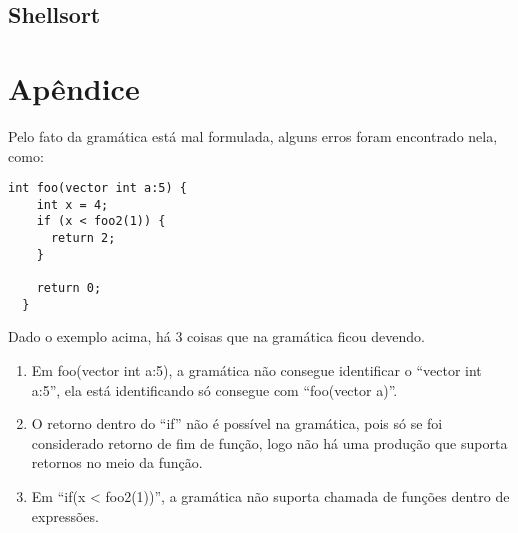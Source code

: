 \documentclass[12pt, a4paper]{memoir}
\begin{document}
\subsection{Shellsort}
\label{subsec:shellsort}



\section*{Apêndice}
Pelo fato da gramática está mal formulada, alguns erros foram encontrado nela, como:
\begin{lstlisting}[style=code]
  int foo(vector int a:5) {
    int x = 4;
    if (x < foo2(1)) {
      return 2;
    }

    return 0;
  }
\end{lstlisting}
Dado o exemplo acima, há 3 coisas que na gramática ficou devendo.
\begin{enumerate}
\item Em foo(vector int a:5), a gramática não consegue identificar o ``vector int a:5'', ela está identificando só consegue com ``foo(vector a)''.
\item O retorno dentro do ``if'' não é possível na gramática, pois só se foi considerado retorno de fim de função, logo não há uma produção que suporta retornos no meio da função.
\item Em ``if(x < foo2(1))'', a gramática não suporta chamada de funções dentro de expressões.
\end{enumerate}
\end{document}
